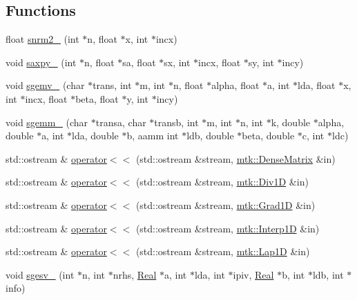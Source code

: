 \subsection*{Functions}
\begin{DoxyCompactItemize}
\item 
float \hyperlink{namespacemtk_a508e99fcb14d526bc43aa0a80aa4b658}{snrm2\-\_\-} (int $\ast$n, float $\ast$x, int $\ast$incx)
\item 
void \hyperlink{namespacemtk_a81a2d7d1ea9eff65ae13646c93dad5e9}{saxpy\-\_\-} (int $\ast$n, float $\ast$sa, float $\ast$sx, int $\ast$incx, float $\ast$sy, int $\ast$incy)
\item 
void \hyperlink{namespacemtk_a88daff7ad6f251a58b94aa2d0c94d069}{sgemv\-\_\-} (char $\ast$trans, int $\ast$m, int $\ast$n, float $\ast$alpha, float $\ast$a, int $\ast$lda, float $\ast$x, int $\ast$incx, float $\ast$beta, float $\ast$y, int $\ast$incy)
\item 
void \hyperlink{namespacemtk_adb7c0560326b8e57f255e58b87ec76b0}{sgemm\-\_\-} (char $\ast$transa, char $\ast$transb, int $\ast$m, int $\ast$n, int $\ast$k, double $\ast$alpha, double $\ast$a, int $\ast$lda, double $\ast$b, aamm int $\ast$ldb, double $\ast$beta, double $\ast$c, int $\ast$ldc)
\item 
std\-::ostream \& \hyperlink{namespacemtk_ad3bcf52cda59ddb5fc7b4bdce76c46dc}{operator$<$$<$} (std\-::ostream \&stream, \hyperlink{classmtk_1_1DenseMatrix}{mtk\-::\-Dense\-Matrix} \&in)
\item 
std\-::ostream \& \hyperlink{namespacemtk_a12db5e6fff3788f728819a60d5c28d01}{operator$<$$<$} (std\-::ostream \&stream, \hyperlink{classmtk_1_1Div1D}{mtk\-::\-Div1\-D} \&in)
\item 
std\-::ostream \& \hyperlink{namespacemtk_a3f546b8a3743b8719db17e33f2d7ef7f}{operator$<$$<$} (std\-::ostream \&stream, \hyperlink{classmtk_1_1Grad1D}{mtk\-::\-Grad1\-D} \&in)
\item 
std\-::ostream \& \hyperlink{namespacemtk_a1defe4e644a8c7d89bcceb0b1bc2372f}{operator$<$$<$} (std\-::ostream \&stream, \hyperlink{classmtk_1_1Interp1D}{mtk\-::\-Interp1\-D} \&in)
\item 
std\-::ostream \& \hyperlink{namespacemtk_af667c01a388ef1815d549b09b2d76bcc}{operator$<$$<$} (std\-::ostream \&stream, \hyperlink{classmtk_1_1Lap1D}{mtk\-::\-Lap1\-D} \&in)
\item 
void \hyperlink{namespacemtk_ae1d63c7ae73b3c48e0dca81eb19039f3}{sgesv\-\_\-} (int $\ast$n, int $\ast$nrhs, \hyperlink{group__c01-roots_gac080bbbf5cbb5502c9f00405f894857d}{Real} $\ast$a, int $\ast$lda, int $\ast$ipiv, \hyperlink{group__c01-roots_gac080bbbf5cbb5502c9f00405f894857d}{Real} $\ast$b, int $\ast$ldb, int $\ast$info)

\end{DoxyCompactItemize}
